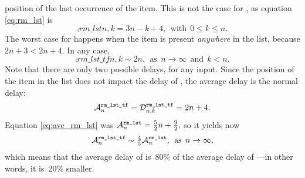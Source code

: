 position of the last occurrence of the item. This is not the case for
, as equation \eqref{eq:rm_lst}
 is
\[
\comp{rm\_lst}{n,k} = 3n - k + 4, \,\; \text{with} \,\; 0 \leqslant k
\leqslant n.
\]
The worst case for  happens when the item is
present \emph{anywhere} in the list, because \(2n + 3 < 2n + 4\). In
any case,
\[
\comp{rm\_lst\_tf}{n,k} \mathrel{\sim} 2n, \,\; \text{as} \,\; n
\rightarrow \infty \,\; \text{and} \,\; k < n.
\]
Note that there are only two possible delays, for any input. Since the
position of the item in the list does not impact the delay of
, the average delay is the normal delay:
\[
\ave{rm\_lst\_tf}{n} = \comp{rm\_lst\_tf}{n,k} = 2n + 4.
\]
Equation \eqref{eq:ave_rm_lst}  was
\(
\ave{rm\_lst}{n} = \tfrac{5}{2}{n} + \tfrac{9}{2},
\)
so it yields now
\[
\ave{rm\_lst\_tf}{n} \mathrel{\sim} \tfrac{4}{5}
\ave{rm\_lst}{n},\,\; \text{as} \,\; n \rightarrow \infty,
\]
which means that the average delay of  is~80\%
of the average delay of ---in other words, it
is~20\% smaller.

